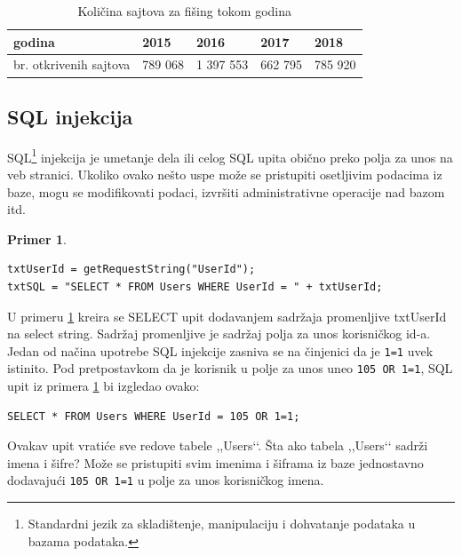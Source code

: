 \documentclass[a4paper]{article}
\theoremstyle{break}
\newtheorem{primer}{Primer}[section]
\begin{document}
{\begin{table}[h!]
\begin{center}
\caption{Količina sajtova za fišing tokom godina}
\begin{tabular}{|l||l|l|l|l|} \hline
godina                  & 2015 & 2016 & 2017 & 2018\\ \hline
br. otkrivenih sajtova  & 789 068 & 1 397 553& 662 795& 785 920\\ \hline
\end{tabular}
\label{tab:tabela1}
\end{center}
\end{table}



\subsection{SQL injekcija}
\label{subsec:sql}

SQL\footnote{Standardni jezik za skladištenje, manipulaciju i dohvatanje podataka u bazama podataka.} injekcija je umetanje dela ili celog SQL upita obično preko polja za unos na veb stranici. Ukoliko ovako nešto uspe može se pristupiti osetljivim podacima iz baze, mogu se modifikovati podaci, izvršiti administrativne operacije nad bazom itd. 

\begin{primer}
\label{primer_1}
\begin{lstlisting}[frame=single]
txtUserId = getRequestString("UserId");
txtSQL = "SELECT * FROM Users WHERE UserId = " + txtUserId;
\end{lstlisting}
\end{primer}
\noindent U primeru \ref{primer_1} kreira se SELECT upit dodavanjem sadržaja promenljive txtUserId na select string. Sadržaj promenljive je sadržaj polja za unos korisničkog id-a.\\

Jedan od načina upotrebe SQL injekcije zasniva se na činjenici da je \texttt{1=1} uvek istinito. Pod pretpostavkom da je korisnik u polje za unos uneo \texttt{105 OR 1=1}, SQL upit iz primera \ref{primer_1} bi izgledao ovako:

\begin{lstlisting}[frame=single]
SELECT * FROM Users WHERE UserId = 105 OR 1=1;
\end{lstlisting}
\noindent Ovakav upit vratiće sve redove tabele ,,Users‘‘. Šta ako tabela ,,Users‘‘ sadrži imena i šifre? Može se pristupiti svim imenima i šiframa iz baze jednostavno dodavajući \texttt{105 OR 1=1} u polje za unos korisničkog imena.\\

}
\end{document}
